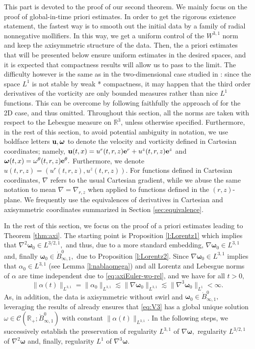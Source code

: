 \documentclass[11pt]{amsart}
\newcommand{\R}{{\mathbb R}}
\def\cC{{\mathcal C}}
\numberwithin{equation}{section}
\newcommand{\nb}{\nabla}
\newcommand{\tht}{\theta}
\newcommand{\omg}{\omega}
\newcommand{\bfe}{{\bf e}}
\newcommand{\bfu}{{\bf u}}
\newcommand{\bfomg}{{\boldsymbol{\omega}}}
\def\bbR{\mathbb{R}}
\begin{document}
This part is devoted to the proof of our second theorem. 
We mainly focus on the proof of global-in-time priori estimates. 
In order to get the rigorous existence statement, the fastest way is to smooth out the initial data by 
a family of radial nonnegative mollifiers. In this way, we get a uniform control of the $W^{3,1}$ norm 
and keep the axisymmetric structure of the data. Then, the a priori estimates that will be presented below ensure uniform estimates in the desired spaces, 
and it is expected that compactness results will allow us to pass to the limit. 
The difficulty however is the same as  in the two-dimensional case  studied in \cite{CH}:
 since the space $L^1$ is not stable by weak * compactness, it may happen  that the third order derivatives of 
 the vorticity  are only bounded measures rather than  nice $L^1$ functions.
This can be overcome by following faithfully the approach of \cite{CH} for the 2D case, and thus omitted.
\medbreak 
Throughout this section, all the norms are taken with respect to the Lebesgue measure on $\bbR^{3}$, unless otherwise specified. Furthermore, in the rest of this section, to avoid potential ambiguity in notation, we use boldface letters $\bfu, \bfomg$ to denote the  velocity and vorticity defined in Cartesian coordinates; namely, $\bfu(t,x) = u^{r}(t,r,z) \bfe^{r} + u^{z}(t,r,z) \bfe^{z}$ and $\bfomg(t,x) = \omg^{\tht}(t,r,z)\bfe^{\tht}.$ Furthermore, we denote $u(t,r,z) = (u^r(t,r,z),u^z(t,r,z))$. For functions defined in Cartesian coordinates, $\nb $ refers to the usual Cartesian gradient, while we abuse the same notation to mean $\nb = \nb_{r,z}$ when applied to functions defined in the $(r,z)$-plane. We frequently use the equivalences of derivatives in Cartesian and axisymmetric coordinates summarized in Section \ref{sec:equivalence}. 

 \bigbreak
 
 
 In the rest of this section, we focus on the proof of a priori estimates leading to Theorem \ref{thm:axi}. 
 The starting point is Proposition \ref{l:Lorentz1} which implies that $\nabla^2\bfomg_0\in L^{3/2,1},$ and 
 thus, due to a more standard embedding, $\nabla\bfomg_0\in L^{3,1}$  and, finally
 $\bfomg_0\in\dot B^0_{\infty,1},$ due to Proposition \ref{l:Lorentz2}. 
 Since  $\nabla\bfomg_0\in L^{3,1}$  implies that $\alpha_0\in L^{3,1}$ (see Lemma \ref{l:nablaomega})
 and  all Lorentz and Lebesgue norms of $\alpha$ are time independent due to \eqref{eq:axiEuler-wo-rel}, and we  have 
 for all $t>0,$
$$\|\alpha(t)\|_{L^{3,1}}=\|\alpha_0\|_{L^{3,1}}\lesssim \|\nabla \bfomg_0\|_{L^{3,1}}\lesssim \|\nabla^3 \bfomg_0\|_{L^1}<\infty.$$
As, in addition, the data is axisymmetric without swirl and   
$\bfomg_0\in \dot B^0_{\infty,1},$ leveraging the results of \cite{AHK,D} already ensures 
that \eqref{eq:V3} has a global unique solution $\omega\in \cC(\R_+;\dot B^0_{\infty,1})$ with constant
$\|\alpha(t)\|_{L^{3,1}}. $
 In the following steps, we successively establish the preservation of regularity
 $L^{3,1}$  of  $\nabla\bfomg,$   regularity
 $L^{3/2,1}$  of  $\nabla^2\bfomg$ and, finally,  regularity $L^{1}$  of  $\nabla^3\bfomg.$ 
\end{document}
